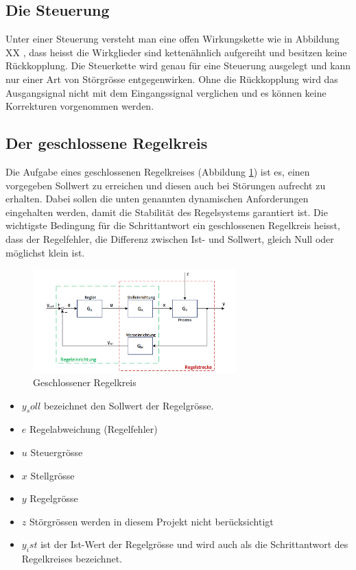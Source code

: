 \subsection{Die Steuerung}
Unter einer Steuerung  versteht man eine offen Wirkungskette  wie in Abbildung
XX , dass heisst  die Wirkglieder sind
ketten\"ahnlich aufgereiht und  besitzen keine R\"uckkopplung. Die Steuerkette
wird  genau  f\"ur  eine  Steuerung  ausgelegt und  kann  nur  einer  Art  von
St\"orgr\"osse entgegenwirken. Ohne die  R\"uckkopplung wird das Ausgangsignal
nicht  mit dem  Eingangssignal verglichen  und es  k\"onnen keine  Korrekturen
vorgenommen werden.

\subsection{Der geschlossene Regelkreis}
Die      Aufgabe     eines      geschlossenen     Regelkreises      (Abbildung
\ref{fig:geschlossenerRegelkreis})  ist  es,   einen  vorgegeben  Sollwert  zu
erreichen und diesen  auch bei St\"orungen aufrecht  zu erhalten. Dabei sollen
die unten  genannten dynamischen  Anforderungen eingehalten werden,  damit die
Stabilit\"at des  Regelsystems garantiert ist. Die wichtigste  Bedingung f\"ur
die Schrittantwort ein geschlossenen  Regelkreis heisst, dass der Regelfehler,
die Differenz zwischen  Ist- und Sollwert, gleich Null  oder m\"oglichst klein
ist.


\begin{figure}[!h!, width=\pagewidth]
    \centering
    \includegraphics[width=0.7\textwidth]{images/geschlRegelkreis}
    \caption{Geschlossener Regelkreis}
    \label{fig:geschlossenerRegelkreis}
\end{figure}

\begin{itemize}
    \item
        $y_soll$ bezeichnet den Sollwert der Regelgr\"osse.
    \item
        $e$ Regelabweichung (Regelfehler)
    \item
        $u$ Steuergr\"osse
    \item
        $x$ Stellgr\"osse
    \item
        $y$ Regelgr\"osse
    \item
        $z$ St\"orgr\"ossen werden in diesem Projekt nicht ber\"ucksichtigt
    \item
        $y_ist$  ist der  Ist-Wert der  Regelgr\"osse  und wird  auch als  die
        Schrittantwort des Regelkreises bezeichnet.
\end{itemize}


